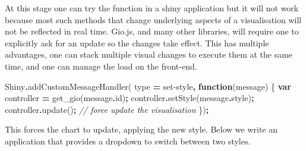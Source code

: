 \documentclass[
]{krantz}
\makeatletter
\newenvironment{Shaded}{\begin{snugshade}}{\end{snugshade}}
\newcommand{\AttributeTok}[1]{\textcolor[rgb]{0.61,0.61,0.61}{#1}}
\newcommand{\CommentTok}[1]{\textcolor[rgb]{0.37,0.37,0.37}{\textit{#1}}}
\newcommand{\FunctionTok}[1]{\textcolor[rgb]{0,0,0}{#1}}
\newcommand{\KeywordTok}[1]{\textcolor[rgb]{0.27,0.27,0.27}{\textbf{#1}}}
\newcommand{\NormalTok}[1]{#1}
\newcommand{\OperatorTok}[1]{\textcolor[rgb]{0.43,0.43,0.43}{\textbf{#1}}}
\newcommand{\StringTok}[1]{\textcolor[rgb]{0.5,0.5,0.5}{#1}}
\newenvironment{kframe}{%
\medskip{}
\setlength{\fboxsep}{.8em}
 \def\at@end@of@kframe{}%
 \ifinner\ifhmode%
  \def\at@end@of@kframe{\end{minipage}}%
  \begin{minipage}{\columnwidth}%
 \fi\fi%
 \def\FrameCommand##1{\hskip\@totalleftmargin \hskip-\fboxsep
 \colorbox{shadecolor}{##1}\hskip-\fboxsep
     \hskip-\linewidth \hskip-\@totalleftmargin \hskip\columnwidth}%
 \MakeFramed {\advance\hsize-\width
   \@totalleftmargin\z@ \linewidth\hsize
   \@setminipage}}%
 {\par\unskip\endMakeFramed%
 \at@end@of@kframe}
\renewenvironment{Shaded}{\begin{kframe}}{\end{kframe}}
\makeatother
\begin{document}
At this stage one can try the function in a shiny application but it will not work because most such methods that change underlying aspects of a visualisation will not be reflected in real time. Gio.js, and many other libraries, will require one to explicitly ask for an update so the changes take effect. This has multiple advantages, one can stack multiple visual changes to execute them at the same time, and one can manage the load on the front-end.

\begin{Shaded}
\begin{Highlighting}[]
\NormalTok{Shiny}\OperatorTok{.}\FunctionTok{addCustomMessageHandler}\NormalTok{(}
\NormalTok{  type }\OperatorTok{=} \StringTok{\textquotesingle{}set{-}style\textquotesingle{}}\OperatorTok{,} \KeywordTok{function}\NormalTok{(message) \{}
    \KeywordTok{var}\NormalTok{ controller }\OperatorTok{=}\NormalTok{ get\_gio(message}\OperatorTok{.}\AttributeTok{id}\NormalTok{)}\OperatorTok{;}
\NormalTok{    controller}\OperatorTok{.}\FunctionTok{setStyle}\NormalTok{(message}\OperatorTok{.}\AttributeTok{style}\NormalTok{)}\OperatorTok{;}
\NormalTok{    controller}\OperatorTok{.}\FunctionTok{update}\NormalTok{()}\OperatorTok{;} \CommentTok{// force update the visualisation}
\NormalTok{\})}\OperatorTok{;}
\end{Highlighting}
\end{Shaded}

This forces the chart to update, applying the new style. Below we write an application that provides a dropdown to switch between two styles.
\end{document}
